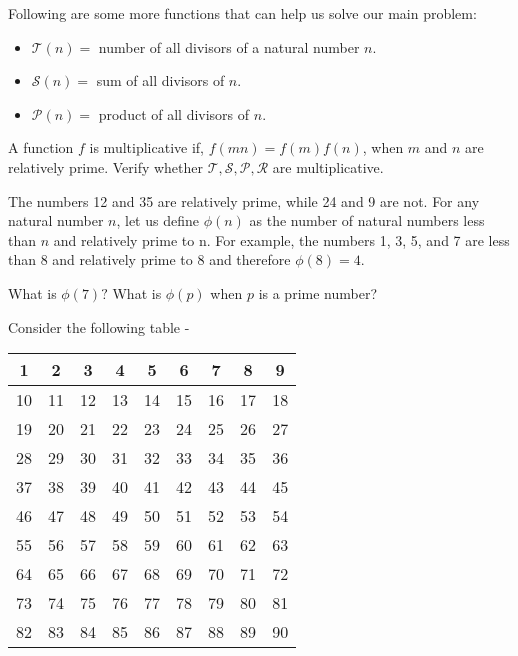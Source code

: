 \documentclass[a4paper,12pt]{article}
\begin{document}
Following are some more functions that can help us solve our main problem:

\begin{itemize}
  \item $\mathcal{T}(n) = $ number of all divisors of a natural number $n$.
  \item $\mathcal{S}(n) = $ sum of all divisors of $n$.
  \item $\mathcal{P}(n) = $ product of all divisors of $n$.
\end{itemize}

A function $f$ is multiplicative if, $f(mn) = f(m)f(n)$, when $m$ and $n$ are relatively prime. Verify whether $\mathcal{T}, \mathcal{S}, \mathcal{P}, \mathcal{R}$ are multiplicative.

The numbers 12 and 35 are relatively prime, while 24 and 9 are not. For any natural number $n$, let us define $\phi(n)$ as the number of natural numbers less than $n$ and relatively prime to n. For example, the numbers 1, 3, 5, and 7 are less than 8 and relatively prime to 8 and therefore $\phi(8) = 4$. 

What is $\phi(7)?$ What is $\phi(p)$ when $p$ is a prime number? 

Consider the following table - 

\begin{table}[h]
  \centering
  \begin{tabular}{|c|c|c|c|c|c|c|c|c|}
    \hline
    1 & 2 & 3 & 4 & 5 & 6 & 7 & 8 & 9 \\
    \hline
    10 & 11 & 12 & 13 & 14 & 15 & 16 & 17 & 18 \\
    \hline
    19 & 20 & 21 & 22 & 23 & 24 & 25 & 26 & 27 \\
    \hline
    28 & 29 & 30 & 31 & 32 & 33 & 34 & 35 & 36 \\
    \hline
    37 & 38 & 39 & 40 & 41 & 42 & 43 & 44 & 45 \\
    \hline
    46 & 47 & 48 & 49 & 50 & 51 & 52 & 53 & 54 \\
    \hline
    55 & 56 & 57 & 58 & 59 & 60 & 61 & 62 & 63 \\
    \hline
    64 & 65 & 66 & 67 & 68 & 69 & 70 & 71 & 72 \\
    \hline
    73 & 74 & 75 & 76 & 77 & 78 & 79 & 80 & 81 \\
    \hline
    82 & 83 & 84 & 85 & 86 & 87 & 88 & 89 & 90 \\
    \hline
  \end{tabular}
\end{table}
\end{document}
